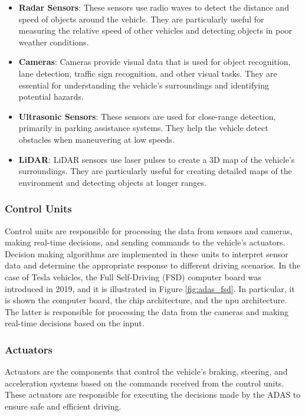 \begin{itemize}
    \item \textbf{Radar Sensors}: These sensors use radio waves to detect the 
    distance and speed of objects around the vehicle. They are particularly 
    useful for measuring the relative speed of other vehicles and detecting 
    objects in poor weather conditions.
    
    \item \textbf{Cameras}: Cameras provide visual data that is used for object 
    recognition, lane detection, traffic sign recognition, and other visual 
    tasks. They are essential for understanding the vehicle's surroundings and 
    identifying potential hazards.
    
    \item \textbf{Ultrasonic Sensors}: These sensors are used for close-range 
    detection, primarily in parking assistance systems. They help the vehicle 
    detect obstacles when maneuvering at low speeds.
    
    \item \textbf{LiDAR}: LiDAR sensors use laser pulses to create a 3D map of 
    the vehicle's surroundings. They are particularly useful for creating 
    detailed maps of the environment and detecting objects at longer ranges.
\end{itemize}

\subsubsection*{Control Units}
Control units are responsible for processing the data from sensors and cameras, 
making real-time decisions, and sending commands to the vehicle's actuators.
Decision making algorithms are implemented in these units to interpret sensor 
data and determine the appropriate response to different driving scenarios.
In the case of Tesla vehicles, the Full Self-Driving (FSD) computer board 
was introduced in 2019, and it is illustrated in Figure \ref{fig:adas_fsd}.
In particular, it is shown the computer board, the chip architecture, and the 
\acf{npu} architecture. The latter is responsible for processing the data 
from the cameras and making real-time decisions based on the input.

\subsubsection*{Actuators}
Actuators are the components that control the vehicle's braking, steering, and 
acceleration systems based on the commands received from the control units. 
These actuators are responsible for executing the decisions made by the ADAS 
to ensure safe and efficient driving.

